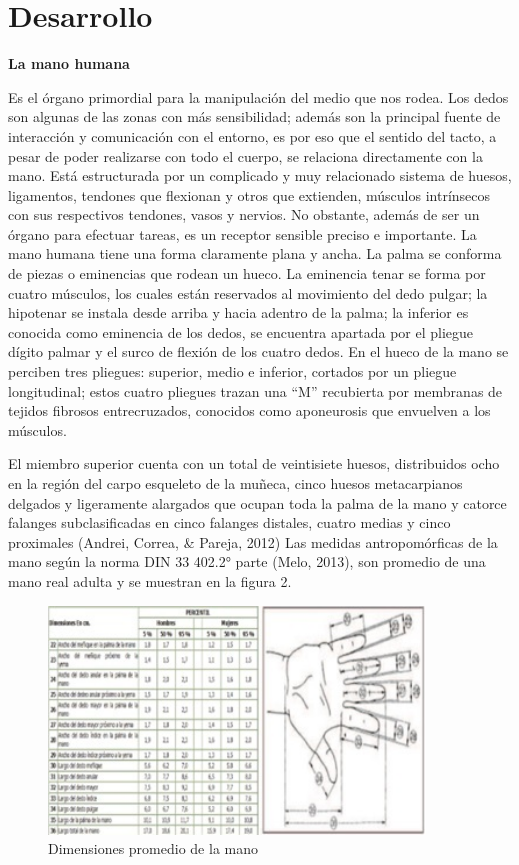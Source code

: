 \documentclass{article}
\begin{document}
\section{Desarrollo}
\cite{chavez2014diseno}\textbf{La mano humana}

\item Es el órgano primordial para la manipulación del medio que nos rodea. Los dedos son algunas de las zonas con más sensibilidad; además son la principal fuente de interacción y comunicación con el entorno, es por eso que el sentido del tacto, a pesar de poder realizarse con todo el cuerpo, se relaciona directamente con la mano. Está estructurada por un complicado y muy relacionado sistema de huesos, ligamentos, tendones que flexionan y otros que extienden, músculos intrínsecos con sus respectivos tendones, vasos y nervios. No obstante, además de ser un órgano para efectuar tareas, es un receptor sensible preciso e importante. La mano humana tiene una forma claramente plana y ancha. La palma se conforma de piezas o eminencias que rodean un hueco. La eminencia tenar se forma por cuatro músculos, los cuales están reservados al movimiento del dedo pulgar; la hipotenar se instala desde arriba y hacia adentro de la palma; la inferior es conocida como eminencia de los dedos, se encuentra apartada por el pliegue dígito palmar y el surco de flexión de los cuatro dedos. En el hueco de la mano se perciben tres pliegues: superior, medio e inferior, cortados por un pliegue longitudinal; estos cuatro pliegues trazan una “M” recubierta por membranas de tejidos fibrosos entrecruzados, conocidos como aponeurosis que envuelven a los músculos.

El miembro superior cuenta con un total de veintisiete huesos, distribuidos ocho en la región del carpo esqueleto de la muñeca, cinco huesos metacarpianos delgados y ligeramente alargados que ocupan toda la palma de la mano y catorce falanges subclasificadas en cinco falanges distales, cuatro medias y cinco proximales (Andrei, Correa, & Pareja, 2012)
Las medidas antropomórficas de la mano según la norma DIN 33 402.2° parte (Melo, 2013), son promedio de una mano real adulta y se muestran en la figura 2.
\vspace{5mm}


\begin{figure} %
    \centering
    \includegraphics[width=100mm]{dimensiones.jpg} %
    \caption{Dimensiones promedio de la mano}
    \label{grafica}
\end{figure}
\end{document}
